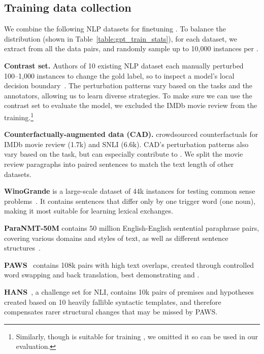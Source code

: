 \subsection{Training data collection}


We combine the following NLP datasets for finetuning \sysname.
To balance the distribution (shown in Table~\ref{table:gpt_train_stats}), for each dataset, we extract \tagstrs from all the data pairs, and randomly sample up to 10,000 instances per \tagstr.

\textbf{Contrast set.}
Authors of 10 existing NLP dataset each manually perturbed 100--1,000 instances to change the gold label, so to inspect a model's local decision boundary~\cite{gardner2020contrast}.
The perturbation patterns vary based on the tasks and the annotators, allowing us to learn diverse strategies.
To make sure we can use the contrast set to evaluate the \sst model, we excluded the IMDb movie review from the training.\footnote{Similarly, though \qqp is suitable for training \sysname, we omitted it so \qqp can be used in our evaluation.}


\textbf{Counterfactually-augmented data (CAD).}
\citet{kaushik2019learning} crowdsourced counterfactuals for IMDb movie review (1.7k) and SNLI (6.6k).
CAD's perturbation patterns also vary based on the task, but can especially contribute to .
We split the movie review paragraphs into paired sentences to match the text length of other datasets.


\textbf{WinoGrande} is a large-scale dataset of 44k instances for testing common sense problems~\cite{sakaguchi2019winogrande}.
It contains sentences that differ only by one trigger word (\eg one noun), making it most suitable for learning lexical exchanges.

\textbf{ParaNMT-50M} contains 50 million English-English sentential paraphrase pairs, covering various domains and styles of text, as well as different sentence structures~\cite{wieting2017paranmt}. 

\textbf{PAWS}~\cite{zhang2019paws} contains 108k pairs with high text overlaps, created through controlled word swapping and back translation, best demonstrating  and .


\textbf{HANS}~\cite{mccoy2019right}, a challenge set for NLI, contains 10k pairs of premises and hypotheses created based on 10 heavily fallible syntactic templates, and therefore compensates rarer structural changes that may be missed by PAWS.


